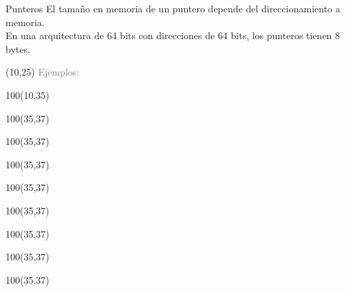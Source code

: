 \documentclass[aspectratio=169]{beamer}
\begin{document}
\begin{frame}[fragile,t]{Punteros}
    El tamaño en memoria de un puntero depende del direccionamiento a memoria. \\ En una arquitectura de 64 bits con direcciones de 64 bits, los punteros tienen 8 bytes.
    \begin{textblock}{87}(10,25)
    \textcolor{gray}{Ejemplos:}
    \end{textblock}
    \begin{textblock}{100}(10,35)
    \end{textblock}
    \begin{textblock}{100}(35,37)  \end{textblock} %
    \begin{textblock}{100}(35,37)  \end{textblock} %
    \begin{textblock}{100}(35,37)  \end{textblock} %
    \begin{textblock}{100}(35,37)  \end{textblock} %
    \begin{textblock}{100}(35,37)  \end{textblock} %
    \begin{textblock}{100}(35,37)  \end{textblock} %
    \begin{textblock}{100}(35,37)  \end{textblock} %
    \begin{textblock}{100}(35,37)  \end{textblock} %

\end{frame}
\end{document}
